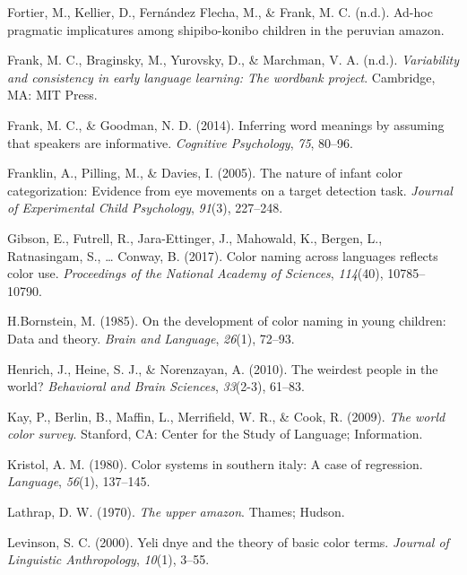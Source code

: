 \documentclass[
  english,
  ,man,floatsintext]{apa6}
\begin{document}
\leavevmode\hypertarget{ref-fortierunderreview}{}%
Fortier, M., Kellier, D., Fernández Flecha, M., \& Frank, M. C. (n.d.). Ad-hoc pragmatic implicatures among shipibo-konibo children in the peruvian amazon.

\leavevmode\hypertarget{ref-frank2020}{}%
Frank, M. C., Braginsky, M., Yurovsky, D., \& Marchman, V. A. (n.d.). \emph{Variability and consistency in early language learning: The wordbank project}. Cambridge, MA: MIT Press.

\leavevmode\hypertarget{ref-frank2014}{}%
Frank, M. C., \& Goodman, N. D. (2014). Inferring word meanings by assuming that speakers are informative. \emph{Cognitive Psychology}, \emph{75}, 80--96.

\leavevmode\hypertarget{ref-franklin2005}{}%
Franklin, A., Pilling, M., \& Davies, I. (2005). The nature of infant color categorization: Evidence from eye movements on a target detection task. \emph{Journal of Experimental Child Psychology}, \emph{91}(3), 227--248.

\leavevmode\hypertarget{ref-gibson2017}{}%
Gibson, E., Futrell, R., Jara-Ettinger, J., Mahowald, K., Bergen, L., Ratnasingam, S., \ldots{} Conway, B. (2017). Color naming across languages reflects color use. \emph{Proceedings of the National Academy of Sciences}, \emph{114}(40), 10785--10790.

\leavevmode\hypertarget{ref-bornstein1985}{}%
H.Bornstein, M. (1985). On the development of color naming in young children: Data and theory. \emph{Brain and Language}, \emph{26}(1), 72--93.

\leavevmode\hypertarget{ref-henrich2010}{}%
Henrich, J., Heine, S. J., \& Norenzayan, A. (2010). The weirdest people in the world? \emph{Behavioral and Brain Sciences}, \emph{33}(2-3), 61--83.

\leavevmode\hypertarget{ref-berlin2009}{}%
Kay, P., Berlin, B., Maffin, L., Merrifield, W. R., \& Cook, R. (2009). \emph{The world color survey}. Stanford, CA: Center for the Study of Language; Information.

\leavevmode\hypertarget{ref-kristol1980}{}%
Kristol, A. M. (1980). Color systems in southern italy: A case of regression. \emph{Language}, \emph{56}(1), 137--145.

\leavevmode\hypertarget{ref-lathrap1970}{}%
Lathrap, D. W. (1970). \emph{The upper amazon}. Thames; Hudson.

\leavevmode\hypertarget{ref-levinson2000}{}%
Levinson, S. C. (2000). Yeli dnye and the theory of basic color terms. \emph{Journal of Linguistic Anthropology}, \emph{10}(1), 3--55.
\end{document}
